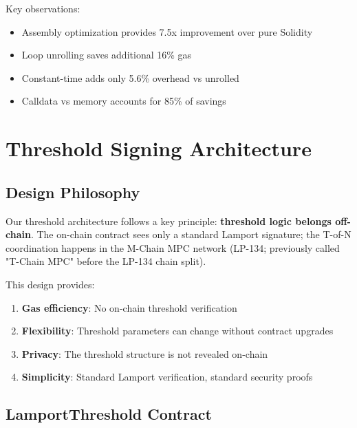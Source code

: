 \documentclass[11pt,a4paper]{article}
\begin{document}
Key observations:
\begin{itemize}
    \item Assembly optimization provides 7.5x improvement over pure Solidity
    \item Loop unrolling saves additional 16\% gas
    \item Constant-time adds only 5.6\% overhead vs unrolled
    \item Calldata vs memory accounts for 85\% of savings
\end{itemize}

\section{Threshold Signing Architecture}

\subsection{Design Philosophy}

Our threshold architecture follows a key principle: \textbf{threshold logic belongs off-chain}. The on-chain contract sees only a standard Lamport signature; the T-of-N coordination happens in the M-Chain MPC network (LP-134; previously called "T-Chain MPC" before the LP-134 chain split).

This design provides:
\begin{enumerate}[leftmargin=*]
    \item \textbf{Gas efficiency}: No on-chain threshold verification
    \item \textbf{Flexibility}: Threshold parameters can change without contract upgrades
    \item \textbf{Privacy}: The threshold structure is not revealed on-chain
    \item \textbf{Simplicity}: Standard Lamport verification, standard security proofs
\end{enumerate}

\subsection{LamportThreshold Contract}
\end{document}
